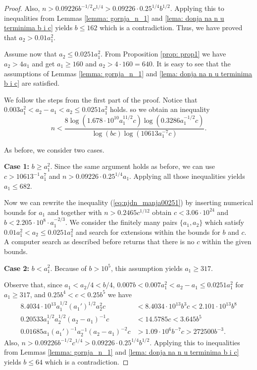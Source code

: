 \documentclass[12pt]{amsart}%
\theoremstyle{definition}
\theoremstyle{remark}
\theoremstyle{plain}
\begin{document}
\begin{proof}
Also, $n>0.09226b^{-1/2}c^{1/4}>0.09226\cdot 0.25^{1/4}b^{1/2}$. Applying this to inequalities from Lemmas \ref{lemma: gornja_n_1} and \ref{lema: donja na n u terminima b i c} yields $b\leq 162$ which is a contradiction. Thus, we have proved that $a_2>0.01a_1^2$.


Assume now that $a_2 \leq 0.0251a_1^2$. From Proposition \ref{prop: prop1} we have $a_2>4a_1$ and get $a_1\geq 160$ and $a_2 > 4\cdot 160=640$. It is easy to see that the assumptions of Lemmas \ref{lemma: gornja_n_1} and \ref{lema: donja na n u terminima b i c} are satisfied.

We follow the steps from the first part of the proof.
    Notice that $0.003a_1^2<a_2-a_1<a_2\leq0.0251a_1^2$ holds. 
so we obtain an inequality
\begin{equation}\label{eq:njdn_manja00251}
    n<\frac{8\log(1.678\cdot 10^{10}a_1^{11/2}c)\log(0.3286a_1^{-1/2}c)}{\log(bc)\log(10613a_1^{-7}c)}.
\end{equation}

As before, we consider two cases.

\textbf{Case 1:} $b \geq a_1^2$. Since the same argument holds as before, 
 we can use $c>10613^{-1}a_1^7$ and $n>0.09226\cdot 0.25^{1/4}a_1$. Applying all those inequalities yields $a_1\leq 682$. 

Now we can rewrite the inequality (\ref{eq:njdn_manja00251}) by inserting numerical bounds for $a_1$ and together with $n>0.2465c^{1/12}$ obtain $c<3.06\cdot 10^{24}$ and $b<2.205\cdot 10^{8}\cdot a_1^{-2/3}$. We consider the finitely many pairs $\{a_1,a_2\}$ which satisfy $ 0.01a_1^2<a_2\leq 0.0251a_1^2$ and search for extensions within the bounds for $b$ and $c$. A computer search as described before returns that there is no $c$ within the given bounds.

\textbf{Case 2:} $b<a_1^2$. 
Because of $b>10^5$, this assumption yields $a_1 \geq 317$. 


Observe that, since $a_1<a_2/4<b/4$, $0.007b<0.007a_1^2<a_2-a_1\leq 0.0251a_1^2$ for $a_1\geq 317$, and $0.25b^4<c<0.25b^5$ we have
   \begin{align*}
 8.4034\cdot 10^{13}a_1^{1/2}(a_1')^{1/2}a_2^2c&<8.4034\cdot 10^{13}b^3c<2.101\cdot 10^{13}b^8\\
 0.20533a_1^{1/2}a_2^{1/2}(a_2-a_1)^{-1}c&<14.5785c<3.645b^5\\
 0.01685a_1(a_1')^{-1}a_2^{-1}(a_2-a_1)^{-2}c&>1.09\cdot 10^6b^{-7}c>272500b^{-3}. 
\end{align*}
Also, $n>0.09226b^{-1/2}c^{1/4}>0.09226\cdot 0.25^{1/4}b^{1/2}$. Applying this to inequalities from Lemmas \ref{lemma: gornja_n_1} and \ref{lema: donja na n u terminima b i c} yields $b\leq 64$ which is a contradiction. 
\end{proof}
\end{document}
